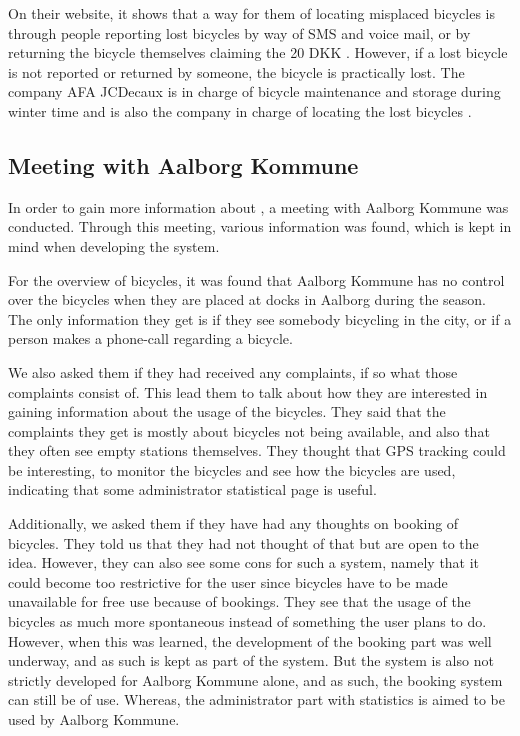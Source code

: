 On their website, it shows that a way for them of locating misplaced bicycles is through people reporting lost bicycles by way of SMS and voice mail, or by returning the bicycle themselves claiming the 20 DKK \citep{misc:aalborgbycykelmangler}.
However, if a lost bicycle is not reported or returned by someone, the bicycle is practically lost.
The company AFA JCDecaux is in charge of bicycle maintenance and storage during winter time and is also the company in charge of locating the lost bicycles \citep{misc:aalborgcykling}.

\subsection{Meeting with Aalborg Kommune}\label{subsec:meetingaalborg}
In order to gain more information about \bycykelwithoutspace, a meeting with Aalborg Kommune was conducted. 
Through this meeting, various information was found, which is kept in mind when developing the system.

For the overview of bicycles, it was found that Aalborg Kommune has no control over the bicycles when they are placed at docks in Aalborg during the season.
The only information they get is if they see somebody bicycling in the city, or if a person makes a phone-call regarding a bicycle.

We also asked them if they had received any complaints, if so what those complaints consist of.
This lead them to talk about how they are interested in gaining information about the usage of the bicycles.
They said that the complaints they get is mostly about bicycles not being available, and also that they often see empty stations themselves.
They thought that GPS tracking could be interesting, to monitor the bicycles and see how the bicycles are used, indicating that some administrator statistical page is useful.

Additionally, we asked them if they have had any thoughts on booking of bicycles.
They told us that they had not thought of that but are open to the idea.
However, they can also see some cons for such a system, namely that it could become too restrictive for the user since bicycles have to be made unavailable for free use because of bookings.
They see that the usage of the bicycles as much more spontaneous instead of something the user plans to do.
However, when this was learned, the development of the booking part was well underway, and as such is kept as part of the system.
But the system is also not strictly developed for Aalborg Kommune alone, and as such, the booking system can still be of use.
Whereas, the administrator part with statistics is aimed to be used by Aalborg Kommune.

